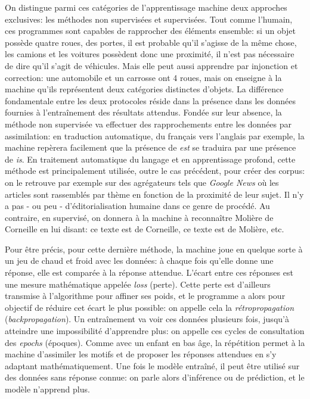 On distingue parmi ces catégories de l'apprentissage machine deux approches exclusives: les méthodes non supervisées et supervisées. Tout comme l'humain, ces programmes sont capables de rapprocher des éléments ensemble: si un objet possède quatre roues, des portes, il est probable qu'il s'agisse de la même chose, les camions et les voitures possèdent donc une proximité, il n'est pas nécessaire de dire qu'il s'agit de véhicules. Mais elle peut aussi apprendre par injonction et correction: une automobile et un carrosse ont 4 roues, mais on enseigne à la machine qu'ils représentent deux catégories distinctes d'objets. La différence fondamentale entre les deux protocoles réside dans la présence dans les données fournies à l'entraînement des résultats attendus. Fondée sur leur absence, la méthode non supervisée va effectuer des rapprochements entre les données par assimilation: en traduction automatique, du français vers l'anglais par exemple, la machine repèrera facilement que la présence de \textit{est} se traduira par une présence de \textit{is}. En traitement automatique du langage et en apprentissage profond, cette méthode est principalement utilisée, outre le cas précédent, pour créer des corpus: on le retrouve par exemple sur des agrégateurs tels que \textit{Google News} où les articles sont rassemblés par thème en fonction de la proximité de leur sujet. Il n'y a pas - ou peu - d'éditorialisation humaine dans ce genre de procédé. Au contraire, en supervisé, on donnera à la machine à reconnaître Molière de Corneille en lui disant: ce texte est de Corneille, ce texte est de Molière, etc. 

Pour être précis, pour cette dernière méthode, la machine joue en quelque sorte à un jeu de chaud et froid avec les données: à chaque fois qu'elle donne une réponse, elle est comparée à la réponse attendue. L'écart entre ces réponses est une mesure mathématique appelée \textit{loss} (perte). Cette perte est d'ailleurs transmise à l'algorithme pour affiner ses poids, et le programme a alors pour objectif de réduire cet écart le plus possible: on appelle cela la \textit{rétropropagation} (\textit{backpropagation}). Un entraînement va voir ces données plusieurs fois, jusqu'à atteindre une impossibilité d'apprendre plus: on appelle ces cycles de consultation des \textit{epochs} (époques). Comme avec un enfant en bas âge, la répétition permet à la machine d'assimiler les motifs et de proposer les réponses attendues en s'y adaptant mathématiquement. Une fois le modèle entraîné, il peut être utilisé sur des données sans réponse connue: on parle alors d'inférence ou de prédiction, et le modèle n'apprend plus.

